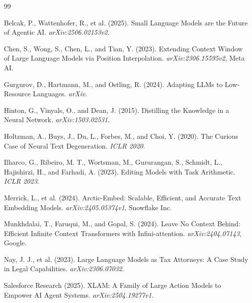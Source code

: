 \documentclass[11pt,a4paper]{article}
\begin{document}

\begin{thebibliography}{99}

Belcak, P., Wattenhofer, R., et al. (2025).
\newblock Small Language Models are the Future of Agentic AI.
\newblock \textit{arXiv:2506.02153v2}.

Chen, S., Wong, S., Chen, L., and Tian, Y. (2023).
\newblock Extending Context Window of Large Language Models via Position Interpolation.
\newblock \textit{arXiv:2306.15595v2}, Meta AI.

Gurgurov, D., Hartmann, M., and Ostling, R. (2024).
\newblock Adapting LLMs to Low-Resource Languages.
\newblock \textit{arXiv}.

Hinton, G., Vinyals, O., and Dean, J. (2015).
\newblock Distilling the Knowledge in a Neural Network.
\newblock \textit{arXiv:1503.02531}.

Holtzman, A., Buys, J., Du, L., Forbes, M., and Choi, Y. (2020).
\newblock The Curious Case of Neural Text Degeneration.
\newblock \textit{ICLR 2020}.

Ilharco, G., Ribeiro, M. T., Wortsman, M., Gururangan, S., Schmidt, L., Hajishirzi, H.,
and Farhadi, A. (2023).
\newblock Editing Models with Task Arithmetic.
\newblock \textit{ICLR 2023}.

Merrick, L., et al. (2024).
\newblock Arctic-Embed: Scalable, Efficient, and Accurate Text Embedding Models.
\newblock \textit{arXiv:2405.05374v1}, Snowflake Inc.

Munkhdalai, T., Faruqui, M., and Gopal, S. (2024).
\newblock Leave No Context Behind: Efficient Infinite Context Transformers with Infini-attention.
\newblock \textit{arXiv:2404.07143}, Google.

Nay, J. J., et al. (2023).
\newblock Large Language Models as Tax Attorneys: A Case Study in Legal Capabilities.
\newblock \textit{arXiv:2306.07032}.

Salesforce Research (2025).
\newblock XLAM: A Family of Large Action Models to Empower AI Agent Systems.
\newblock \textit{arXiv:2504.19277v1}.


\end{thebibliography}
\end{document}
